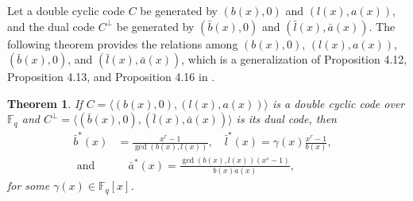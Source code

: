 \documentclass[12pt]{article}
\newtheorem{theorem}{Theorem}[section]
\begin{document}
	Let a double cyclic code $C$ be generated by $(b(x),0)$ and $(l(x),a(x))$, and the dual code $C^{\perp}$ be generated by $(\bar{b}(x),0)$ and $(\bar{l}(x),\bar{a}(x))$. The following theorem provides the relations among $(b(x),0)$, $(l(x),a(x))$, $(\bar{b}(x),0)$, and $(\bar{l}(x),\bar{a}(x))$, which is a generalization of Proposition 4.12, Proposition 4.13, and Proposition 4.16 in \cite{Borges2018}.
	\begin{theorem}\label{gendual}
		If $C=\langle(b(x),0),(l(x),a(x))\rangle$ is a double cyclic code over $\mathbb{F}_q$ and $C^{\perp}=\langle(\bar{b}(x),0),(\bar{l}(x),\bar{a}(x))\rangle$ is its dual code, then
		\begin{align*}
			\bar{b}^{*}(x)&=\frac{x^r-1}{\gcd(b(x),l(x))}, \quad\bar{l}^{*}(x)=\gamma(x)\frac{x^r-1}{b(x)}, \\
			\text{ and }&\quad\bar{a}^{*}(x)=\frac{\gcd(b(x),l(x))(x^s-1)}{b(x) a(x)},&
		\end{align*}
		for some $\gamma(x)\in\mathbb{F}_q[x]$.
	\end{theorem}
\end{document}
